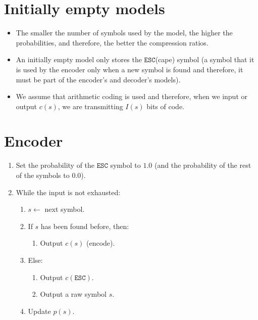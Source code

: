 \section{Initially empty models}
\label{modelo_probabilistico_adaptativo_vacio}
\begin{itemize}
\item The smaller the number of symbols used by the model, the higher
  the probabilities, and therefore, the better the compression ratios.
\item An initially empty model only stores the $\mathtt{ESC}$(cape) symbol (a
  symbol that it is used by the encoder only when a new symbol is
  found and therefore, it must be part of the encoder's and decoder's models).
\item We assume that arithmetic coding is used and therefore, when we
  input or output $c(s)$, we are transmitting $I(s)$ bits of code.
\end{itemize}

\section{Encoder}
\begin{enumerate}
\item Set the probability of the $\mathtt{ESC}$ symbol to $1.0$ (and the probability of
  the rest of the symbols to $0.0$).
\item While the input is not exhausted:
  \begin{enumerate}
  \item $s\leftarrow$ next symbol.
  \item If $s$ has been found before, then:
    \begin{enumerate}
    \item Output $c(s)$ (encode).
    \end{enumerate}
  \item Else:
    \begin{enumerate}
    \item Output $c(\mathtt{ESC})$.
    \item Output a raw symbol $s$.
    \end{enumerate}
  \item Update $p(s)$.
  \end{enumerate}
\end{enumerate}

